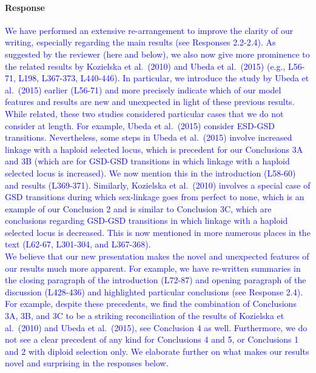 \documentclass[10pt,letterpaper]{article}
\begin{document}
\noindent\paragraph{Response}
\textcolor{blue}{
We have performed an extensive re-arrangement to improve the clarity of our writing, especially regarding the main results (see Responses 2.2-2.4). 
As suggested by the reviewer (here and below), we also now give more prominence to the related results by Kozielska et al.\ (2010) and Ubeda et al.\ (2015) (e.g., L56-71, L198, L367-373, L440-446). 
In particular, we introduce the study by Ubeda et al.\ (2015) earlier (L56-71) and more precisely indicate which of our model features and results are new and unexpected in light of these previous results.
\\
\indent
While related, these two studies considered particular cases that we do not consider at length. 
For example, Ubeda et al.\ (2015) consider ESD-GSD transitions. 
Nevertheless, some steps in Ubeda et al.\ (2015) involve increased linkage with a haploid selected locus, which is precedent for our Conclusions 3A and 3B (which are for GSD-GSD transitions in which linkage with a haploid selected locus is increased).
We now mention this in the introduction (L58-60) and results (L369-371). %
Similarly, Kozielska et al.\ (2010) involves a special case of GSD transitions during which sex-linkage goes from perfect to none, which is an example of our Conclusion 2 and is similar to Conclusion 3C, which are conclusions regarding GSD-GSD transitions in which linkage with a haploid selected locus is decreased.
This is now mentioned in more numerous places in the text (L62-67, L301-304, and L367-368). 
\\
\indent
We believe that our new presentation makes the novel and unexpected features of our results much more apparent. 
For example, we have re-written summaries in the closing paragraph of the introduction (L72-87) and opening paragraph of the discussion (L428-436) and highlighted particular conclusions (see Response 2.4). 
For example, despite these precedents, we find the combination of Conclusions 3A, 3B, and 3C to be a striking reconciliation of the results of Kozielska et al.\ (2010) and Ubeda et al.\ (2015), see Conclusion 4 as well. 
Furthermore, we do not see a clear precedent of any kind for Conclusions 4 and 5, or Conclusions 1 and 2 with diploid selection only. 
We elaborate further on what makes our results novel and surprising in the responses below.
}
\end{document}
